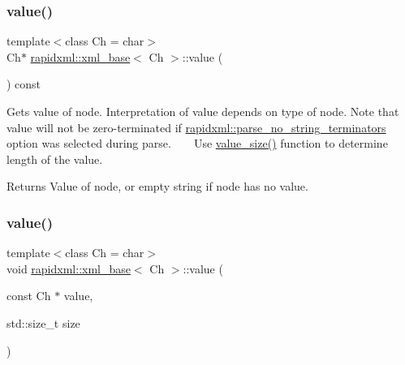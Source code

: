 \subsubsection{\texorpdfstring{value()}{value()}\hspace{0.1cm}{\footnotesize\ttfamily [2/6]}}
{\footnotesize\ttfamily template$<$class Ch  = char$>$ \\
Ch$\ast$ \mbox{\hyperlink{classrapidxml_1_1xml__base}{rapidxml\+::xml\+\_\+base}}$<$ Ch $>$\+::value (\begin{DoxyParamCaption}{ }\end{DoxyParamCaption}) const\hspace{0.3cm}{\ttfamily [inline]}}

Gets value of node. Interpretation of value depends on type of node. Note that value will not be zero-\/terminated if \mbox{\hyperlink{namespacerapidxml_af3fc88ba6bee33482a2db81b1da36ea1}{rapidxml\+::parse\+\_\+no\+\_\+string\+\_\+terminators}} option was selected during parse. ~\newline
~\newline
 Use \mbox{\hyperlink{classrapidxml_1_1xml__base_a2eb123d471b1567fa4832b6ee2b75493}{value\+\_\+size()}} function to determine length of the value. \begin{DoxyReturn}{Returns}
Value of node, or empty string if node has no value. 
\end{DoxyReturn}
\mbox{\label{classrapidxml_1_1xml__base_a3b183c2db7022a6d30494dd2f0ac11e9}} 
\subsubsection{\texorpdfstring{value()}{value()}\hspace{0.1cm}{\footnotesize\ttfamily [3/6]}}
{\footnotesize\ttfamily template$<$class Ch  = char$>$ \\
void \mbox{\hyperlink{classrapidxml_1_1xml__base}{rapidxml\+::xml\+\_\+base}}$<$ Ch $>$\+::value (\begin{DoxyParamCaption}\item[{const Ch $\ast$}]{value,  }\item[{std\+::size\+\_\+t}]{size }\end{DoxyParamCaption})\hspace{0.3cm}{\ttfamily [inline]}}

